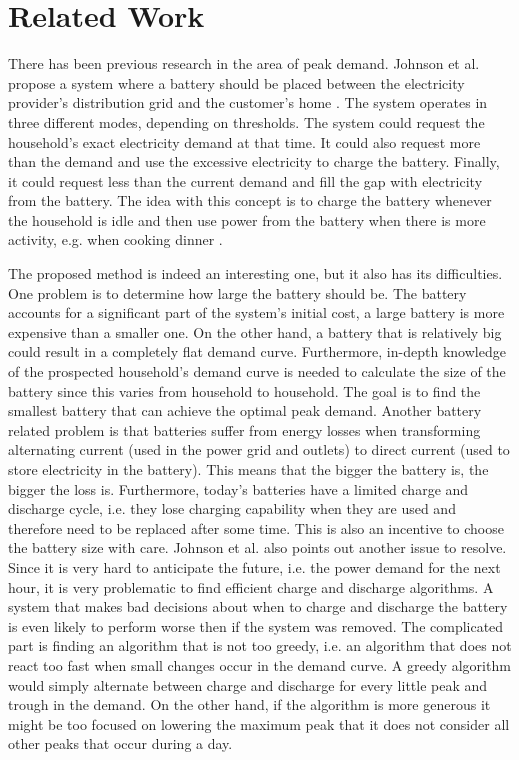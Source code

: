 \section{Related Work}
\label{sec:related work}
There has been previous research in the area of peak demand. Johnson et al. propose a system where a battery should be placed between the electricity provider's distribution grid and the customer's home \cite{johnson2011energy}. The system operates in three different modes, depending on thresholds. The system could request the household's exact electricity demand at that time. It could also request more than the demand and use the excessive electricity to charge the battery. Finally, it could request less than the current demand and fill the gap with electricity from the battery. The idea with this concept is to charge the battery whenever the household is idle and then use power from the battery when there is more activity, e.g. when cooking dinner \cite{johnson2011energy}.

The proposed method is indeed an interesting one, but it also has its difficulties. One problem is to determine how large the battery should be. The battery accounts for a significant part of the system's initial cost, a large battery is more expensive than a smaller one. On the other hand, a battery that is relatively big could result in a completely flat demand curve. Furthermore, in-depth knowledge of the prospected household's demand curve is needed to calculate the size of the battery since this varies from household to household. The goal is to find the smallest battery that can achieve the optimal peak demand. Another battery related problem is that batteries suffer from energy losses when transforming alternating current (used in the power grid and outlets) to direct current (used to store electricity in the battery). This means that the bigger the battery is, the bigger the loss is. Furthermore, today's batteries have a limited charge and discharge cycle, i.e. they lose charging capability when they are used and therefore need to be replaced after some time. This is also an incentive to choose the battery size with care. Johnson et al. also points out another issue to resolve. Since it is very hard to anticipate the future, i.e. the power demand for the next hour, it is very problematic to find efficient charge and discharge algorithms. A system that makes bad decisions about when to charge and discharge the battery is even likely to perform worse then if the system was removed. The complicated part is finding an algorithm that is not too greedy, i.e. an algorithm that does not react too fast when small changes occur in the demand curve. A greedy algorithm would simply alternate between charge and discharge for every little peak and trough in the demand. On the other hand, if the algorithm is more generous it might be too focused on lowering the maximum peak that it does not consider all other peaks that occur during a day.

